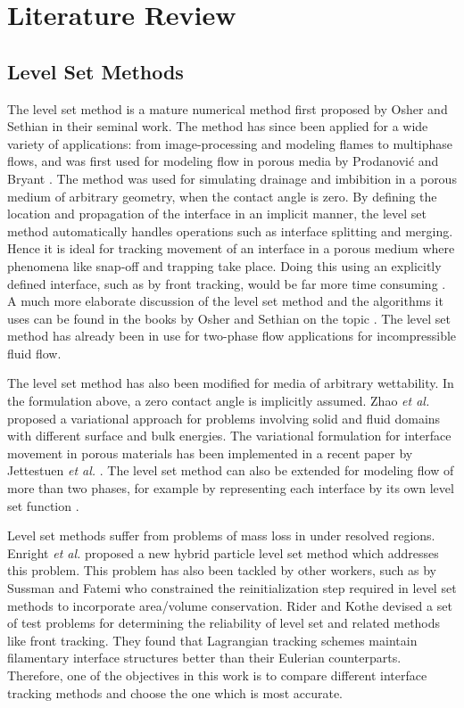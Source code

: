 \section{Literature Review}

\subsection{Level Set Methods}
The level set method is a mature numerical method first proposed by Osher and Sethian in their seminal work\cite{osher_fronts_1988}. The method has  since been applied for a wide variety of applications: from image-processing and modeling flames to multiphase flows, and was first used for modeling flow in porous media by Prodanovi\'{c} and Bryant \cite{prodono}. The method was used for simulating drainage and imbibition in a porous medium of arbitrary geometry, when the contact angle is zero. By defining the location and propagation of the interface in an implicit manner, the level set method automatically handles operations such as interface splitting and merging. Hence it is ideal for tracking movement of an interface in a porous medium where phenomena like snap-off and trapping take place. Doing this using an explicitly defined interface, such as by front tracking, would be far more time consuming \cite{unverdi1992front}. A much more elaborate discussion of the level set method and the algorithms it uses can be found in the books by Osher and Sethian on the topic \cite{osher_level_2003, sethian_level_1999}. The level set method has already been in use for two-phase flow applications for incompressible fluid flow\cite{olsson_conservative_2005}. 

The level set method has also been modified for media of arbitrary wettability. In the formulation above, a zero contact angle is implicitly assumed. Zhao \emph{et al.} \cite{zhao_capturing_1998} proposed a variational approach for problems involving solid and fluid domains with different surface and bulk energies. The variational formulation for interface movement in porous materials has been implemented in a recent paper by Jettestuen \emph{et al.} \cite{jettestuen_level_2013}. The level set method can also be extended for modeling flow of more than two phases, for example by representing each interface by its own level set function \cite{esodoglu_variational_2008}. 

Level set methods suffer from problems of mass loss in under resolved regions. Enright \emph{et al.} proposed a new hybrid particle level set method which addresses this problem. This problem has also been tackled by other workers, such as by Sussman and Fatemi \cite{} who constrained the reinitialization step required in level set methods to incorporate area/volume conservation. Rider and Kothe \cite{} devised a set of test problems for determining the reliability of level set and related methods like front tracking. They found that Lagrangian tracking schemes maintain filamentary interface structures better than their Eulerian counterparts. Therefore, one of the objectives in this work is to compare different interface tracking methods and choose the one which is most accurate.

